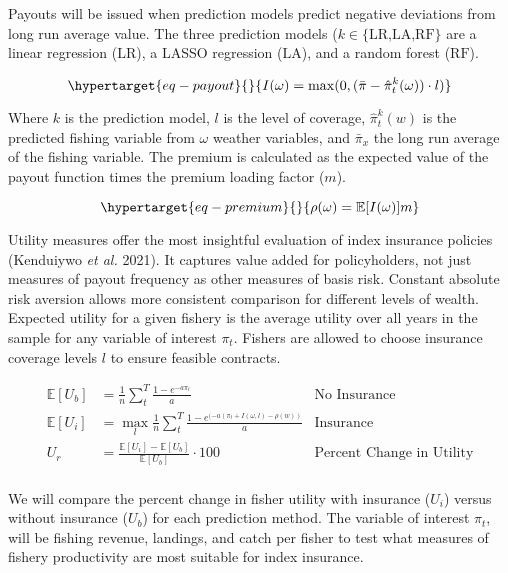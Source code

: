 \documentclass[
  letterpaper,
  DIV=11,
  numbers=noendperiod]{scrartcl}
\begin{document}
Payouts will be issued when prediction models predict negative
deviations from long run average value. The three prediction models
(\(k\in\{\text{LR,LA,RF}\}\) are a linear regression (\(\text{LR}\)), a
LASSO regression (\(\text{LA}\)), and a random forest (\(\text{RF}\)).

\begin{equation}\protect\hypertarget{eq-payout}{}{
I(\omega)=\max(0,(\bar{\pi}-\hat\pi_t^k(\omega)) \cdot l)
}\label{eq-payout}\end{equation}

Where \(k\) is the prediction model, \(l\) is the level of coverage,
\(\hat\pi_t^k(w)\) is the predicted fishing variable from \(\omega\)
weather variables, and \(\bar{\pi}_{x}\) the long run average of the
fishing variable. The premium is calculated as the expected value of the
payout function times the premium loading factor (\(m\)).

\begin{equation}\protect\hypertarget{eq-premium}{}{
\rho(\omega)=\mathbb{E}[I(\omega)]m
}\label{eq-premium}\end{equation}

Utility measures offer the most insightful evaluation of index insurance
policies (Kenduiywo \emph{et al.} 2021). It captures value added for
policyholders, not just measures of payout frequency as other measures
of basis risk. Constant absolute risk aversion allows more consistent
comparison for different levels of wealth. Expected utility for a given
fishery is the average utility over all years in the sample for any
variable of interest \(\pi_t\). Fishers are allowed to choose insurance
coverage levels \(l\) to ensure feasible contracts.

\[
\begin{aligned}
\mathbb{E}[U_{b}]&=\frac{1}{n}\sum_{t}^{T}\frac{1-e^{-a\pi_t}}{a} &\text{No Insurance}\\
\mathbb{E}[U_{i}]&=\max_{l}\frac{1}{n}\sum_{t}^{T}\frac{1-e^{(-a(\pi_t+I(\omega,l)-\rho(w))}}{a} &\text{Insurance}\\
U_{r}&=\frac{\mathbb{E}[U_i]-\mathbb{E}[U_b]}{\mathbb{E}[U_b]}\cdot100 &\text{Percent Change in Utility}\\
\end{aligned}
\]

We will compare the percent change in fisher utility with insurance
(\(U_i\)) versus without insurance (\(U_{b}\)) for each prediction
method. The variable of interest \(\pi_t\), will be fishing revenue,
landings, and catch per fisher to test what measures of fishery
productivity are most suitable for index insurance.
\end{document}
